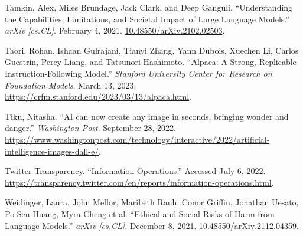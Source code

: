 \documentclass{article}
\begin{document}
\begin{thebibliography}{9}
  Tamkin, Alex, Miles Brundage, Jack Clark, and Deep Ganguli. ``Understanding the Capabilities, Limitations, and Societal Impact of Large Language Models.'' \textit{arXiv [cs.CL]}. February 4, 2021. \href{https://doi.org/10.48550/arXiv.2102.02503}{10.48550/arXiv.2102.02503}.

  Taori, Rohan, Ishaan Gulrajani, Tianyi Zhang, Yann Dubois, Xuechen Li, Carlos Guestrin, Percy Liang, and Tatsunori Hashimoto. ``Alpaca: A Strong, Replicable Instruction-Following Model.'' \textit{Stanford University Center for Research on Foundation Models}. March 13, 2023. \href{https://crfm.stanford.edu/2023/03/13/alpaca.html}{https://crfm.stanford.edu/2023/03/13/alpaca.html}. 

  Tiku, Nitasha. ``AI can now create any image in seconds, bringing wonder and danger.'' \textit{Washington Post}. September 28, 2022. \href{https://www.washingtonpost.com/technology/interactive/2022/artificial-intelligence-images-dall-e/}{https://www.washingtonpost.com/technology/interactive/2022/artificial-intelligence-images-dall-e/}.

  Twitter Transparency. ``Information Operations.'' Accessed July 6, 2022. \href{https://transparency.twitter.com/en/reports/information-operations.html}{https://transparency.twitter.com/en/reports/information-operations.html}.

  Weidinger, Laura, John Mellor, Maribeth Rauh, Conor Griffin, Jonathan Uesato, Po-Sen Huang, Myra Cheng et al. ``Ethical and Social Risks of Harm from Language Models.'' \textit{arXiv [cs.CL]}. December 8, 2021. \href{https://arxiv.org/abs/2112.04359}{10.48550/arXiv.2112.04359}.
  
\end{thebibliography}
\end{document}
